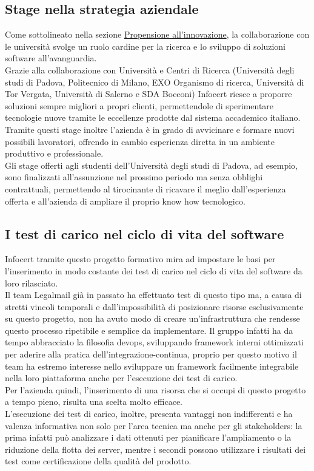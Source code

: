 \subsection{Stage nella strategia aziendale}
Come sottolineato nella sezione \hyperref[sec:innovazione]{Propensione all'innovazione}, la collaborazione con le università svolge un ruolo cardine per la ricerca e lo sviluppo di soluzioni software all'avanguardia. \\
Grazie alla collaborazione con Università e Centri di Ricerca (Università degli studi di Padova, Politecnico di Milano, EXO Organismo di ricerca, Università di Tor Vergata, Università di Salerno e SDA Bocconi) Infocert riesce a proporre soluzioni sempre migliori a propri clienti, permettendole di sperimentare tecnologie nuove tramite le eccellenze prodotte dal sistema accademico italiano. \\
Tramite questi stage inoltre l'azienda è in grado di avvicinare e formare nuovi possibili lavoratori, offrendo in cambio esperienza diretta in un ambiente produttivo e professionale. \\
Gli stage offerti agli studenti dell'Università degli studi di Padova, ad esempio, sono finalizzati all'assunzione nel prossimo periodo ma senza obblighi contrattuali, permettendo al tirocinante di ricavare il meglio dall'esperienza offerta e all'azienda di ampliare il proprio know how tecnologico.  
\subsection{I test di carico nel ciclo di vita del software}
Infocert tramite questo progetto formativo mira ad impostare le basi per l'inserimento in modo costante dei test di carico nel ciclo di vita del software da loro rilasciato. \\
Il team Legalmail già in passato ha effettuato test di questo tipo ma, a causa di stretti vincoli temporali e dall'impossibilità di posizionare risorse esclusivamente su questo progetto, non ha avuto modo di creare un'infrastruttura che rendesse questo processo ripetibile e semplice da implementare.  
Il gruppo infatti ha da tempo abbracciato la filosofia \gls{devops}, sviluppando \gls{framework} interni ottimizzati per aderire alla pratica dell'\gls{integrazione-continua}, proprio per questo motivo il team ha estremo interesse nello sviluppare un framework facilmente integrabile nella loro piattaforma anche per l'esecuzione dei test di carico. \\
Per l'azienda quindi, l'inserimento di una risorsa che si occupi di questo progetto a tempo pieno, risulta una scelta molto efficace. \\
L'esecuzione dei test di carico, inoltre, presenta vantaggi non indifferenti e ha valenza informativa non solo per l'area tecnica ma anche per gli \gls{stakeholders}: la prima infatti può analizzare i dati ottenuti per pianificare l'ampliamento o la riduzione della flotta dei server, mentre i secondi possono utilizzare i risultati dei test come certificazione della qualità del prodotto.